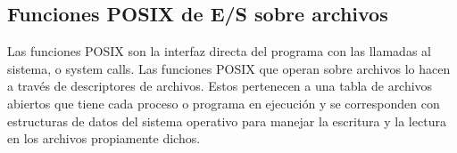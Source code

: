 % 

\subsection{Funciones POSIX de E/S sobre archivos}
\label{subsec:esarchivosposix}

Las funciones POSIX son la interfaz directa del programa con las llamadas al
sistema, o system calls. Las funciones POSIX que operan sobre archivos lo hacen
a través de descriptores de archivos. Estos pertenecen a una tabla de archivos
abiertos que tiene cada proceso o programa en ejecución y se corresponden con
estructuras de datos del sistema operativo para manejar la escritura y la
lectura en los archivos propiamente dichos.

